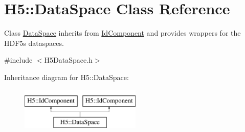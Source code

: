 \hypertarget{class_h5_1_1_data_space}{}\section{H5\+:\+:Data\+Space Class Reference}
\label{class_h5_1_1_data_space}


Class \hyperlink{class_h5_1_1_data_space}{Data\+Space} inherits from \hyperlink{class_h5_1_1_id_component}{Id\+Component} and provides wrappers for the H\+D\+F5\textquotesingle{}s dataspaces.  




{\ttfamily \#include $<$H5\+Data\+Space.\+h$>$}

Inheritance diagram for H5\+:\+:Data\+Space\+:\begin{figure}[H]
\begin{center}
\leavevmode
\includegraphics[height=2.000000cm]{class_h5_1_1_data_space}
\end{center}
\end{figure}
